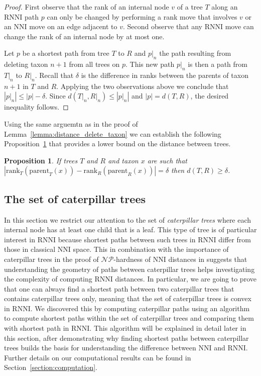 \documentclass{amsart}
\newcommand{\np}{\mathcal{NP}}
\newcommand{\parent}{\mathrm{parent}}
\newcommand{\rank}{\mathrm{rank}}
\newcommand{\nni}{\mathrm{NNI}}
\newcommand{\rnni}{\mathrm{RNNI}}
\newtheorem{proposition}[definition]{Proposition}
\begin{document}
\begin{proof}
First observe that the rank of an internal node $v$ of a tree $T$ along an $\rnni$ path $p$ can only be changed by performing a rank move that involves $v$ or an $\nni$ move on an edge adjacent to $v$.
Second observe that any $\rnni$ move can change the rank of an internal node by at most one.

Let $p$ be a shortest path from tree $T$ to $R$ and $p{\big|}_n$ the path resulting from deleting taxon $n+1$ from all trees on $p$.
This new path $p{\big|}_n$ is then a path from $T{\big|}_n$ to $R{\big|}_n$.
Recall that $\delta$ is the difference in ranks between the parents of taxon $n+1$ in $T$ and $R$.
Applying the two observations above we conclude that $|p{\big|}_n| \leq |p| - \delta$.
Since $d(T{\big|}_n,R{\big|}_n) \leq |p{\big|}_n|$ and $|p| = d(T,R)$, the desired inequality follows.
\end{proof}

Using the same arguemtn as in the proof of Lemma~\ref{lemma:distance_delete_taxon} we can establish the following Proposition~\ref{proposition:lower_bound_distance} that provides a lower bound on the distance between trees.

\begin{proposition}
If trees $T$ and $R$ and taxon $x$ are such that $|\rank_T(\parent_T(x)) - \rank_R(\parent_R(x))| = \delta$ then $d(T,R) \geq \delta$.
\label{proposition:lower_bound_distance}
\end{proposition}


\subsection{The set of caterpillar trees}
\label{section:caterpillar_convex}

In this section we restrict our attention to the set of \emph{caterpillar trees} where each internal node has at least one child that is a leaf.
This type of tree is of particular interest in $\rnni$ because shortest paths between such trees in $\rnni$ differ from those in classical $\nni$ space.
This in combination with the importance of caterpillar trees in the proof of $\np$-hardness of $\nni$ distances in \autocite{Dasgupta2000-xa} suggests that understanding the geometry of paths between caterpillar trees helps investigating the complexity of computing $\rnni$ distances.
In particular, we are going to prove that one can always find a shortest path between two caterpillar trees that contains caterpillar trees only, meaning that the set of caterpillar trees is convex in $\rnni$.
We discovered this by computing caterpillar paths using an algorithm to compute shortest paths within the set of caterpillar trees and comparing them with shortest path in $\rnni$.
This algorithm will be explained in detail later in this section, after demonstrating why finding shortest paths between caterpillar trees builds the basis for understanding the difference between $\nni$ and $\rnni$.
Further details on our computational results can be found in Section~\ref{section:computation}.
\end{document}
